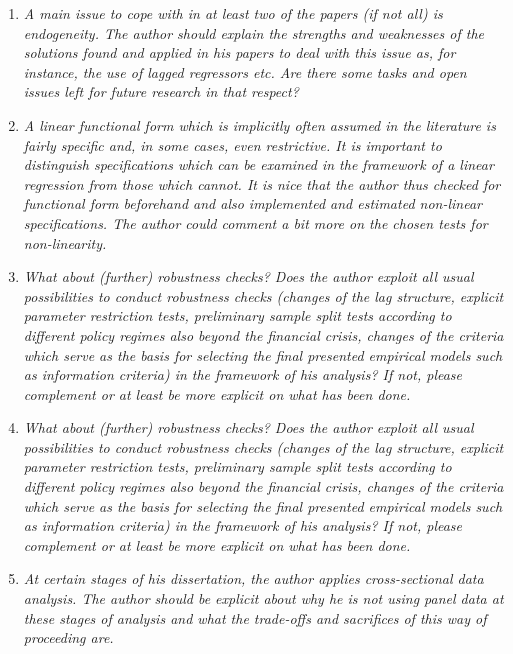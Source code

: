 \begin{enumerate}
    \item \textit{A main issue to cope with in at least two of the papers (if not all) is endogeneity. The author should explain the strengths and weaknesses of the solutions found and applied in his papers to deal with this issue as, for instance, the use of lagged regressors etc. Are there some tasks and open issues left for future research in that respect?}
    
    \item \textit{A linear functional form which is implicitly often assumed in the literature is fairly specific and, in some cases, even restrictive. It is important to distinguish specifications which can be examined in the framework of a linear regression from those which cannot. It is nice that the author thus checked for functional form beforehand and also implemented and estimated non-linear specifications. The author could comment a bit more on the chosen tests for non-linearity.}
    
    \item \textit{What about (further) robustness checks? Does the author exploit all usual possibilities to conduct robustness checks (changes of the lag structure, explicit parameter restriction tests, preliminary sample split tests according to different policy regimes also beyond the financial crisis, changes of the criteria which serve as the basis for selecting the final presented empirical models such as information criteria) in the framework of his analysis? If not, please complement or at least be more explicit on what has been done.}

    \item \textit{What about (further) robustness checks? Does the author exploit all usual possibilities to conduct robustness checks (changes of the lag structure, explicit parameter restriction tests, preliminary sample split tests according to different policy regimes also beyond the financial crisis, changes of the criteria which serve as the basis for selecting the final presented empirical models such as information criteria) in the framework of his analysis? If not, please complement or at least be more explicit on what has been done.}

    \item \textit{At certain stages of his dissertation, the author applies cross-sectional data analysis. The author should be explicit about why he is not using panel data at these stages of analysis and what the trade-offs and sacrifices of this way of proceeding are.}
    

\end{enumerate}
